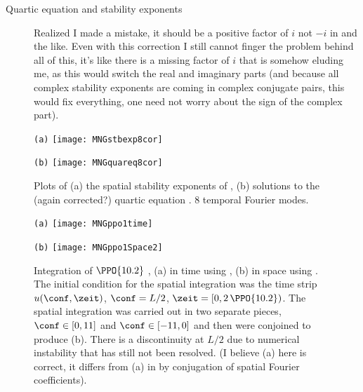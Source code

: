 \begin{description}
{\begin{description}
\item[Quartic equation and stability exponents]
Realized I made a mistake, it should be a positive factor of $i$ not $-i$ in 
and the like. Even with this correction I still cannot finger the problem behind all of this, it's
like there is a missing factor of $i$ that is somehow eluding me, as this would switch the real and
imaginary parts (and because all complex stability exponents are coming in complex conjugate pairs, this
would fix everything, one need not worry about the sign of the complex part).

\end{description}
}

\begin{figure}[ht]
  \begin{minipage}[height=.32\textheight]{.45\textwidth}
    \centering \small{\texttt{(a)}}
    \texttt{[image: MNGstbexp8cor]}
  \end{minipage}
  \begin{minipage}[height=.32\textheight]{.45\textwidth}
    \centering \small{\texttt{(b)}}
    \texttt{[image: MNGquareq8cor]}
  \end{minipage}
   \caption{\label{fig:MNGstbspec8cor}
   Plots of (a) the spatial stability exponents of , (b)
   solutions to the (again corrected?) quartic equation . 8
   temporal Fourier modes.}
\end{figure}

\begin{figure}[ht]
  \begin{minipage}[height=.45\textheight]{.45\textwidth}
    \centering \small{\texttt{(a)}}
    \texttt{[image: MNGppo1time]}
  \end{minipage}
  \begin{minipage}[height=.45\textheight]{.45\textwidth}
    \centering \small{\texttt{(b)}}
    \texttt{[image: MNGppo1Space2]}
  \end{minipage}
   \caption{Integration of $\PPO{10.2}$ , (a) in time using ,
   (b) in space using .
   The initial condition for the spatial integration was the time strip
   $u(\conf,\zeit)$, $\conf = L/2$, $\zeit = [0,2\,\PPO{10.2})$. The spatial
   integration was carried out in two separate pieces, $\conf \in [0,11]$ and
   $\conf \in [-11, 0 ]$ and then were conjoined to produce (b). There is a
   discontinuity at $L/2$ due to numerical instability that has still
   not been resolved. (I believe (a) here is correct,
    it differs from (a) in  by conjugation of spatial Fourier coefficients).}
  \label{fig:MNGppo1spttmp}
\end{figure}


\end{description}
